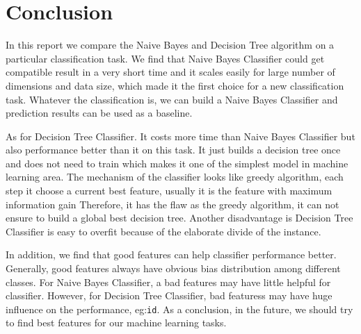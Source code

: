 \documentclass[11pt]{article}
\begin{document}
\section{Conclusion}

In this report we compare the Naive Bayes and Decision Tree algorithm on a particular classification task. We find that Naive Bayes Classifier could get compatible result in a very short time and it scales easily for large number of dimensions and data size, which made it the first choice for a new classification task. Whatever the classification is, we can build a Naive Bayes Classifier and prediction results can be used as a baseline.

As for Decision Tree Classifier. It costs more time than Naive Bayes Classifier but also performance better than it on this task. It just builds a decision tree once and does not need to train which makes it one of the simplest model in machine learning area. The mechanism of the classifier looks like greedy algorithm, each step it choose a current best feature, usually it is the feature with maximum information gain Therefore, it has the flaw as the greedy algorithm, it can not ensure to build a global best decision tree. Another disadvantage is Decision Tree Classifier is easy to overfit because of the elaborate divide of the instance.

In addition, we find that good features can help classifier performance better. Generally, good features always have obvious bias distribution among different classes. For Naive Bayes Classifier, a bad features may have little helpful for classifier. However, for Decision Tree Classifier, bad featuress may have huge influence on the performance, eg:\texttt{id}. As a conclusion, in the future, we should try to find best features for our machine learning tasks.



\end{document}
